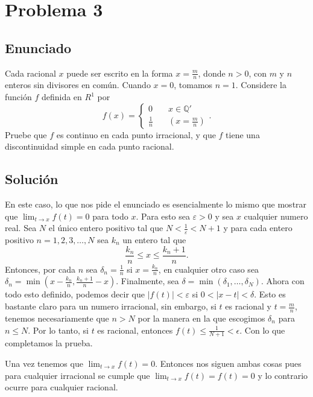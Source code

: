 \documentclass{report}
\begin{document}
\chapter{Problema 3}
\section{Enunciado}
Cada racional $x$ puede ser escrito en la forma $x = \frac{m}{n}$, donde $n > 0$, con $m$ y $n$ enteros sin divisores en común. Cuando $x = 0$, tomamos $n = 1$. Considere la función $f$ definida en $R^{1}$ por \[ f(x) =
\begin{cases}
  0&\quad x\in \mathbb{Q}'\\
  \frac{1}{n}&\quad \left( x = \frac{m}{n} \right) 
\end{cases}
.\] Pruebe que $f$ es continuo en cada punto irracional, y que $f$ tiene una discontinuidad simple en cada punto racional.
\section{Solución}

En este caso, lo que nos pide el enunciado es esencialmente lo mismo que mostrar que $\displaystyle \lim_{t \to x} f\left( t \right) = 0 $ para todo $x$. Para esto sea $\varepsilon > 0$ y sea $x$ cualquier numero  real. Sea $N$ el único entero positivo tal que $N < \frac{1}{\varepsilon} < N + 1$ y para cada entero positivo $n = 1, 2, 3, \ldots, N$ sea $k_n$ un entero tal que \[
\frac{k_n}{n} \le x \le  \frac{k_n + 1}{n}
.\] Entonces, por cada $n$ sea $\delta_n = \frac{1}{n}$ si $x = \frac{k_n}{n}$, en cualquier otro caso sea $\delta_n = \min\left( x - \frac{k_n}{n}, \frac{k_n + 1}{n} - x \right) $. Finalmente, sea $\delta = \min\left( \delta_1, \ldots, \delta_N \right) $. Ahora con todo esto definido, podemos decir que $\left| f\left( t \right)  \right| < \varepsilon$ si $0 < \left| x - t \right| < \delta$. Esto es bastante claro para un numero irracional, sin embargo, si $t$ es racional y $t = \frac{m}{n}$, tenemos necesariamente  que $n > N$ por la manera en la que escogimos $\delta_n$ para  $n \le  N$. Por lo tanto, si $t$ es racional, entonces $f(t) \le \frac{1}{N + 1} < \epsilon$. Con lo que completamos la prueba.

Una vez tenemos que $\displaystyle \lim_{t \to x} f(t) = 0$. Entonces nos siguen ambas cosas pues para cualquier irracional se cumple que $\displaystyle \lim_{t \to x} f\left( t \right) = f\left( t \right) = 0$ y lo contrario ocurre para cualquier racional.
\end{document}
